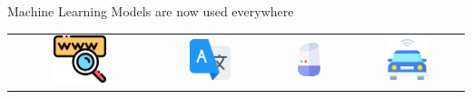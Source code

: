 \begin{frame}{Machine Learning Models are now used everywhere}
  \begin{table}
    \footnotesize{
      \centering
      \begin{tabular}{
	cccc
      }
	\begin{minipage}{0.22\textwidth}
	  \centering
	  \includegraphics[width=0.40\textwidth]{images/icons/www.pdf}
	\end{minipage}
	& 
	\begin{minipage}{0.22\textwidth}
	  \centering
	  \includegraphics[width=0.40\textwidth]{images/icons/translate.pdf}
	\end{minipage}
	&
	\begin{minipage}{0.22\textwidth}
	  \centering
	  \includegraphics[width=0.33\textwidth]{images/icons/assistant-vocal.pdf}
	\end{minipage}
	& 
	\begin{minipage}{0.22\textwidth}
	  \centering
	  \includegraphics[width=0.40\textwidth]{images/icons/autonomous-car.pdf}

\end{minipage}
\end{tabular}}
\end{table}
\end{frame}
